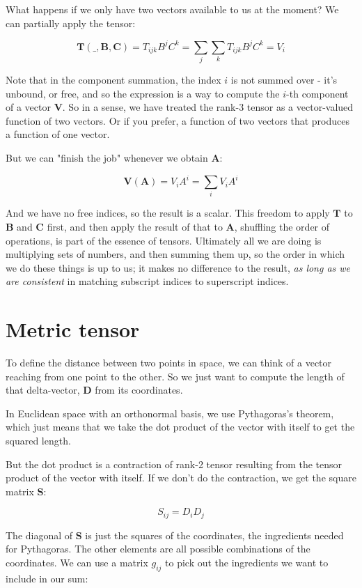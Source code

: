 What happens if we only have two vectors available to us at the moment? We can partially apply the tensor:

$$
\boldsymbol{T(\_,B,C)}
= T_{ijk}B^jC^k
= \sum_j\sum_kT_{ijk}B^jC^k
= V_i
$$

Note that in the component summation, the index $i$ is not summed over - it's unbound, or free, and so the expression is a way to compute the $i$-th component of a vector $\boldsymbol{V}$. So in a sense, we have treated the rank-3 tensor as a vector-valued function of two vectors. Or if you prefer, a function of two vectors that produces a function of one vector.

But we can "finish the job" whenever we obtain $\boldsymbol{A}$:

$$
\boldsymbol{V(A)}
= V_{i}A^i
= \sum_i{V_iA^i}
$$

And we have no free indices, so the result is a scalar. This freedom to apply $\boldsymbol{T}$ to $\boldsymbol{B}$ and $\boldsymbol{C}$ first, and then apply the result of that to $\boldsymbol{A}$, shuffling the order of operations, is part of the essence of tensors. Ultimately all we are doing is multiplying sets of numbers, and then summing them up, so the order in which we do these things is up to us; it makes no difference to the result, \textit{as long as we are consistent} in matching subscript indices to superscript indices.

\section{Metric tensor}

To define the distance between two points in space, we can think of a vector reaching from one point to the other. So we just want to compute the length of that delta-vector, $\boldsymbol{D}$ from its coordinates.

In Euclidean space with an orthonormal basis, we use Pythagoras's theorem, which just means that we take the dot product of the vector with itself to get the squared length.

But the dot product is a contraction of rank-2 tensor resulting from the tensor product of the vector with itself. If we don't do the contraction, we get the square matrix $\boldsymbol{S}$:

$$S_{ij} = D_iD_j$$

The diagonal of $\boldsymbol{S}$ is just the squares of the coordinates, the ingredients needed for Pythagoras. The other elements are all possible combinations of the coordinates. We can use a matrix $g_{ij}$ to pick out the ingredients we want to include in our sum:

